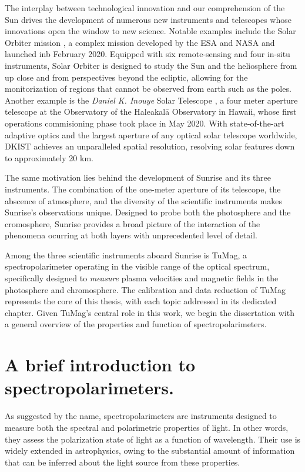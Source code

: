 The interplay between technological innovation and our comprehension of the Sun drives the development of numerous new instruments and telescopes whose innovations open the window to new science. Notable examples include the Solar Orbiter mission \citep{SO}, a complex mission developed by the ESA and NASA and launched inb February 2020. Equipped with six remote-sensing and four in-situ instruments, Solar Orbiter is designed to study the Sun and the heliosphere from up close and from perspectives beyond the ecliptic, allowing for the monitorization of regions that cannot be observed from earth such as the poles. Another example is the \textit{Daniel K. Inouye} Solar Telescope \citep[DKIST;][]{DKIST}, a four meter aperture telescope at the Observatory of the Haleakal\=a Observatory in Hawaii, whose first operations commisioning phase took place in May 2020. With state-of-the-art adaptive optics and the largest aperture of any optical solar telescope worldwide, DKIST achieves an unparalleled spatial resolution, resolving solar features down to approximately 20 km. 

The same motivation lies behind the development of Sunrise and its three instruments.  The combination of the one-meter aperture of its telescope, the abscence of atmosphere, and the diversity of the scientific instruments makes Sunrise's observations unique. Designed to probe both the photosphere and the cromosphere, Sunrise provides a broad picture of the interaction of the phenomena ocurring at both layers with unprecedented level of detail.

Among the three scientific instruments aboard Sunrise is TuMag, a spectropolarimeter operating in the visible range of the optical spectrum, specifically designed to \textit{measure} plasma velocities and magnetic fields in the photosphere and chromosphere. The calibration and data reduction of TuMag represents the core of this thesis, with each topic addressed in its dedicated chapter. Given TuMag’s central role in this work, we begin the dissertation with a general overview of the properties and function of spectropolarimeters.


\section{A brief introduction to spectropolarimeters.}

As suggested by the name, spectropolarimeters are instruments designed to measure both the spectral and polarimetric properties of light. In other words, they assess the polarization state of light as a function of wavelength. Their use is widely extended in astrophysics, owing to the substantial amount of information that can be inferred about the light source from these properties.

